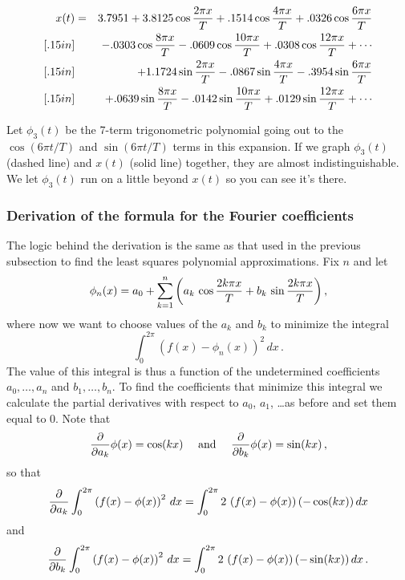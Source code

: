 {{{{\begin{eqnarray*}
x(t)&=&3.7951 + 3.8125\cos{2\pi x \over T}+.1514\cos{4\pi x \over T}+.0326\cos{6\pi x \over T} \\ [.15in]
&&-.0303\cos{8\pi x \over T}-.0609\cos{10\pi x \over T}+.0308\cos{12\pi x \over T}+\cdots \\ [.15in]
& &+1.1724\sin{2\pi x \over T}-.0867\sin{4\pi x \over T}-.3954\sin{6\pi x \over T} \\ [.15in]
&&+.0639\sin{8\pi x \over T}-.0142\sin{10\pi x \over T}+.0129\sin{12\pi x \over T} + \cdots
\end{eqnarray*}

Let $\phi_3(t)$ be the 7-term trigonometric polynomial going out to the $\cos(6\pi t/T)$ and $\sin(6\pi t/T)$ terms in this expansion. If we graph $\phi_3(t)$ (dashed line) and $x(t)$ (solid line) together, they are almost indistinguishable.  We let $\phi_3(t)$ run on a little beyond $x(t)$ so you can see it's there.

\vspace*{2.8in}

\subsubsection{Derivation of the formula for the Fourier coefficients}

The logic behind the derivation is the same as that used in the previous subsection to find the least squares polynomial approximations. Fix $n$ and let
\[
\phi_n(x) =a_0+\sum_{k=1}^n \left(a_k\,\cos{2k\pi x \over T}+b_k\,\sin{2k\pi x \over T}\right),
\]
where now we want to choose values of the $a_k$ and $b_k$ to minimize the integral
\[
\int_0^{2\pi} \left( f(x) -\phi_n (x)\right)^2\, dx \,.
\] 
The value of this integral is thus a function of the undetermined coefficients $a_0, \ldots , a_n$ and $b_1, \ldots , b_n$.  To find the coefficients that minimize this integral we calculate the partial derivatives with respect to $a_0$, $a_1$, \ldots as before and set them equal to 0.  Note that
\[
{\partial \over \partial a_k}\phi(x) = \cos(kx) \quad \mbox{ and } \quad {\partial \over \partial b_k}\phi(x) = \sin(kx) \, ,
\]
so that
\[
{\partial \over \partial a_k}\int_0^{2\pi} \left( f(x) -\phi (x)\right)^2\, dx =\int_0^{2\pi} 2\,\left( f(x) -\phi (x)\right)(-\cos(kx))\, dx
\]
and
\[
{\partial \over \partial b_k}\int_0^{2\pi} \left( f(x) -\phi (x)\right)^2\, dx =\int_0^{2\pi} 2\,\left( f(x) -\phi (x)\right)(-\sin(kx))\, dx \, .
\]

}}}}

